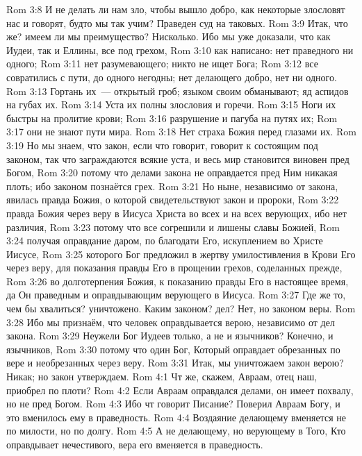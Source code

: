 \vs Rom 3:8 И не делать ли нам зло, чтобы вышло добро, как некоторые злословят нас и говорят, будто мы так учим? Праведен суд на таковых.
\rsbpar\vs Rom 3:9 Итак, что же? имеем ли мы преимущество? Нисколько. Ибо мы уже доказали, что как Иудеи, так и Еллины, все под грехом,
\vs Rom 3:10 как написано: нет праведного ни одного;
\vs Rom 3:11 нет разумевающего; никто не ищет Бога;
\vs Rom 3:12 все совратились с пути, до одного негодны; нет делающего добро, нет ни одного.
\vs Rom 3:13 Гортань их~--- открытый гроб; языком своим обманывают; яд аспидов на губах их.
\vs Rom 3:14 Уста их полны злословия и горечи.
\vs Rom 3:15 Ноги их быстры на пролитие крови;
\vs Rom 3:16 разрушение и пагуба на путях их;
\vs Rom 3:17 они не знают пути мира.
\vs Rom 3:18 Нет страха Божия перед глазами их.
\rsbpar\vs Rom 3:19 Но мы знаем, что закон, если что говорит, говорит к состоящим под законом, так что заграждаются всякие уста, и весь мир становится виновен пред Богом,
\vs Rom 3:20 потому что делами закона не оправдается пред Ним никакая плоть; ибо законом познаётся грех.
\vs Rom 3:21 Но ныне, независимо от закона, явилась правда Божия, о которой свидетельствуют закон и пророки,
\vs Rom 3:22 правда Божия через веру в Иисуса Христа во всех и на всех верующих, ибо нет различия,
\vs Rom 3:23 потому что все согрешили и лишены славы Божией,
\vs Rom 3:24 получая оправдание даром, по благодати Его, искуплением во Христе Иисусе,
\vs Rom 3:25 которого Бог предложил в жертву умилостивления в Крови Его через веру, для показания правды Его в прощении грехов, соделанных прежде,
\vs Rom 3:26 во  долготерпения Божия, к показанию правды Его в настоящее время, да  Он праведным и оправдывающим верующего в Иисуса.
\vs Rom 3:27 Где же то, чем бы хвалиться? уничтожено. Каким законом?  дел? Нет, но законом веры.
\vs Rom 3:28 Ибо мы признаём, что человек оправдывается верою, независимо от дел закона.
\vs Rom 3:29 Неужели Бог  Иудеев только, а не и язычников? Конечно, и язычников,
\vs Rom 3:30 потому что один Бог, Который оправдает обрезанных по вере и необрезанных через веру.
\vs Rom 3:31 Итак, мы уничтожаем закон верою? Никак; но закон утверждаем.
\vs Rom 4:1 Чт же, скажем, Авраам, отец наш, приобрел по плоти?
\vs Rom 4:2 Если Авраам оправдался делами, он имеет похвалу, но не пред Богом.
\vs Rom 4:3 Ибо чт говорит Писание? Поверил Авраам Богу, и это вменилось ему в праведность.
\vs Rom 4:4 Воздаяние делающему вменяется не по милости, но по долгу.
\vs Rom 4:5 А не делающему, но верующему в Того, Кто оправдывает нечестивого, вера его вменяется в праведность.
